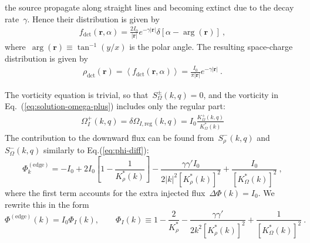 \documentclass[preprint,aps,eqsecnum, prb]{revtex4-1}
\newcommand{\fplus}[1]{{#1}^{+}}
\newcommand{\fminus}[1]{{#1}^{-}}
\newcommand{\fplusminus}[1]{{#1}^{\pm}}
\newcommand{\dct}[1]{{#1}_\mathrm{dct}}
\begin{document}
the source propagate along straight lines and becoming extinct due
to the decay rate~$\gamma$. Hence their distribution is given by
\begin{align}
  \label{eq:f-direct}
  \dct{f}({\bm r}, \alpha) = \frac{2I_0}{|{\bm r}|} e^{-\gamma|{\bm r}|}
  \delta \left[\alpha - \arg({\bm r})\right]\ ,
\end{align}
where~$\arg({\bm r}) \equiv \tan^{-1}(y/x)$ is the polar angle.
The resulting space-charge distribution
is given by
\begin{align}
  \label{eq:rho-direct-edge}
  \dct{\rho}({\bm r}) = \left\langle \dct{f}({\bm r}, \alpha) \right\rangle
  = \frac{I_0}{\pi|{\bm r}|} e^{-\gamma |{\bm r}|}\ .
\end{align}

The vorticity equation is trivial, so that~$\fplusminus{S}_\Omega(k, q) = 0$,
and the vorticity in Eq.~(\ref{eq:solution-omega-plus}) includes
only the regular part:
\begin{align}
  \label{eq:iso-omega}
  \fplus{\Omega}_{I}(k, q)
  = \delta\Omega_{I, \mathrm{reg}}(k, q)
  = I_0 \frac{\fplus{K}_\Omega(k, q)}{K_\Omega^\ast(k)}
\end{align}
The contribution to the downward flux can be found from~$\fminus{S}_\rho(k, q)$
and~$\fminus{S}_\Omega(k, q)$ similarly to Eq.(\ref{eq:phi-diff}):
\begin{equation}
  \label{eq:iso-flux-dPhi}
  \Phi^\mathrm{(edge)}_{k} =  -I_0
  + 2 I_0 \left[1 - \frac{1}{K_\rho^\ast(k)}\right]
  - \frac{\gamma \gamma' I_0}{2|k|^2 \left[K_\rho^\ast(k)\right]^2}
  + \frac{I_0}{\left[K_\Omega^\ast(k)\right]^2}
\ ,
\end{equation}
where the first term accounts for
the extra injected flux~$\Delta\Phi(k) = I_0$.
We rewrite this in the form
\begin{equation}
  \label{eq:phi-iso-surf}
  \Phi^\mathrm{(edge)}(k) =
  I_0 \Phi_I(k), \qquad
  \Phi_I(k) \equiv 1  - \frac{2}{K_\rho^\ast}
    - \frac{\gamma \gamma'}{2k^2 \left[K_\rho^\ast(k)\right]^2}
    + \frac{1}{\left[K_\Omega^\ast(k)\right]^2} \ .
\end{equation}
%
\end{document}
